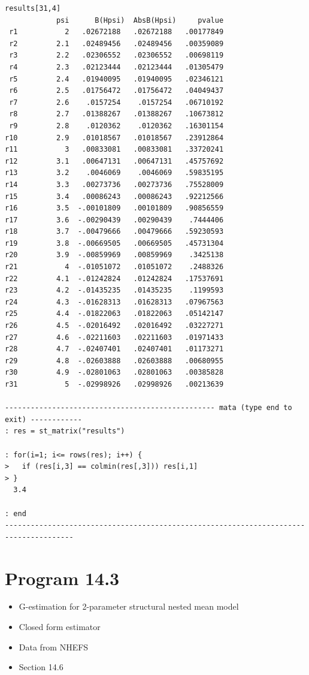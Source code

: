 \documentclass[
  10pt,
  a4paper,
]{book}
\providecommand{\tightlist}{%
  \setlength{\itemsep}{0pt}\setlength{\parskip}{0pt}}
\begin{document}
\begin{verbatim}
results[31,4]
            psi      B(Hpsi)  AbsB(Hpsi)     pvalue
 r1           2   .02672188   .02672188   .00177849
 r2         2.1   .02489456   .02489456   .00359089
 r3         2.2   .02306552   .02306552   .00698119
 r4         2.3   .02123444   .02123444   .01305479
 r5         2.4   .01940095   .01940095   .02346121
 r6         2.5   .01756472   .01756472   .04049437
 r7         2.6    .0157254    .0157254   .06710192
 r8         2.7   .01388267   .01388267   .10673812
 r9         2.8    .0120362    .0120362   .16301154
r10         2.9   .01018567   .01018567   .23912864
r11           3   .00833081   .00833081   .33720241
r12         3.1   .00647131   .00647131   .45757692
r13         3.2    .0046069    .0046069   .59835195
r14         3.3   .00273736   .00273736   .75528009
r15         3.4   .00086243   .00086243   .92212566
r16         3.5  -.00101809   .00101809   .90856559
r17         3.6  -.00290439   .00290439    .7444406
r18         3.7  -.00479666   .00479666   .59230593
r19         3.8  -.00669505   .00669505   .45731304
r20         3.9  -.00859969   .00859969    .3425138
r21           4  -.01051072   .01051072    .2488326
r22         4.1  -.01242824   .01242824   .17537691
r23         4.2  -.01435235   .01435235    .1199593
r24         4.3  -.01628313   .01628313   .07967563
r25         4.4  -.01822063   .01822063   .05142147
r26         4.5  -.02016492   .02016492   .03227271
r27         4.6  -.02211603   .02211603   .01971433
r28         4.7  -.02407401   .02407401   .01173271
r29         4.8  -.02603888   .02603888   .00680955
r30         4.9  -.02801063   .02801063   .00385828
r31           5  -.02998926   .02998926   .00213639

------------------------------------------------- mata (type end to exit) ------------
: res = st_matrix("results")

: for(i=1; i<= rows(res); i++) { 
>   if (res[i,3] == colmin(res[,3])) res[i,1]
> }
  3.4

: end
--------------------------------------------------------------------------------------
\end{verbatim}

\section{Program 14.3}\label{program-14.3-1}

\begin{itemize}
\tightlist
\item
  G-estimation for 2-parameter structural nested mean model
\item
  Closed form estimator
\item
  Data from NHEFS
\item
  Section 14.6
\end{itemize}
\end{document}
